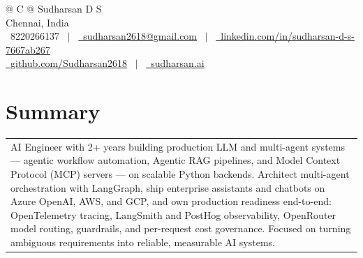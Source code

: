 \documentclass[a4paper,1pt]{article}
\begin{document}
\pagestyle{empty}


\begin{tabularx}{\linewidth}{@{} C @{}}
\Huge{Sudharsan D S} \\[5pt]
Chennai, India \\[3pt]
\raisebox{-0.05\height}\faMobile \ 8220266137 \ $|$ \
\href{mailto:sudharsan2618@gmail.com}{\raisebox{-0.05\height}\faEnvelope \ sudharsan2618@gmail.com} \ $|$ \
\href{https://www.linkedin.com/in/sudharsan-d-s-7667ab267/}{\raisebox{-0.05\height}\faLinkedin\ linkedin.com/in/sudharsan-d-s-7667ab267} \\[2pt]
\href{https://github.com/Sudharsan2618}{\raisebox{-0.05\height}\faGithub\ github.com/Sudharsan2618} \ $|$ \
\href{https://sudharsan2618.github.io/sudharsan-portfolio/}{\raisebox{-0.05\height}\faGlobe \ sudharsan.ai} \\
\end{tabularx}

\section{Summary}
\begin{tabularx}{\linewidth}{@{}X@{}}
AI Engineer with 2+ years building production LLM and multi-agent systems --- agentic workflow automation, Agentic RAG pipelines, and Model Context Protocol (MCP) servers --- on scalable Python backends. Architect multi-agent orchestration with LangGraph, ship enterprise assistants and chatbots on Azure OpenAI, AWS, and GCP, and own production readiness end-to-end: OpenTelemetry tracing, LangSmith and PostHog observability, OpenRouter model routing, guardrails, and per-request cost governance. Focused on turning ambiguous requirements into reliable, measurable AI systems.
\end{tabularx}

\end{document}

